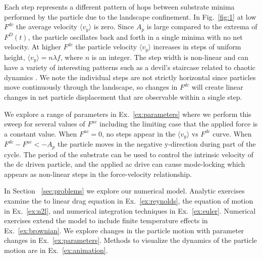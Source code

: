 \documentclass[twocolumn,preprintnumbers,amsmath,amssymb,aps,prx]{revtex4}
\begin{document}
Each step represents a different pattern of hops
between substrate minima
performed by the particle
due to the landscape confinement.  
In Fig.~\ref{fig:1} at %
low $F^{dc}$ the average velocity $\langle v_y \rangle$ is zero.
Since 
$A_p$ is large compared to the extrema of $F^{D}(t)$,
the particle oscillates back and forth
in a single minima with no net velocity.
At higher $F^{dc}$ the particle velocity 
$\langle v_{y} \rangle$ increases in steps of uniform height,
$\langle v_{y} \rangle = n \lambda f$,
where $n$ is an integer.
The step width is non-linear 
and can have a variety of
interesting patterns
such as a devil's staircase related to chaotic dynamics \cite{Bak1986}.
We note the individual steps
are not strictly horizontal 
since particles move continuously
through the landscape, so changes in $F^{dc}$
will create linear changes in 
net particle displacement that are observable
within a single step.



We explore a range of parameters in Ex.~\ref{ex:parameters}
where 
we perform this sweep for several values
of $F^{ac}$ including the limiting case that the applied force
is a constant value.
When $F^{ac} = 0$, no steps appear
in the $\langle v_y \rangle $ vs $F^{dc}$ curve. 
When $F^{dc} - F^{ac} < -A_p$ the particle
moves in the negative y-direction 
during part of the cycle.
The period of the substrate
can be used to control the
intrinsic velocity of the dc driven particle,
and the applied ac drive can cause mode-locking
which appears as non-linear 
steps in the force-velocity relationship.

In Section ~\ref{sec:problems}
we explore our numerical model.
Analytic exercises examine the 
to linear drag equation in Ex.~\ref{ex:reynolds}, 
the equation of motion in Ex.~\ref{ex:n2l},
and 
numerical integration techniques in Ex.~\ref{ex:euler}.
Numerical exercises extend the model
to include finite temperature effects
in Ex.~\ref{ex:brownian}.
We explore changes in the particle motion
with parameter changes in Ex.~\ref{ex:parameters}.
Methods to visualize the dynamics of the particle motion
are in Ex.~\ref{ex:animation}.
\end{document}
